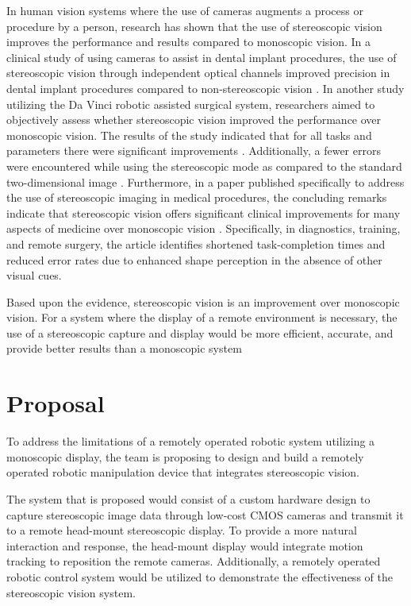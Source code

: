 \documentclass[12pt, journal]{IEEEtran}
\begin{document}
In human vision systems where the use of cameras augments a process or procedure by a person, research has shown that the use of stereoscopic vision improves the performance and results compared to monoscopic vision.  In a clinical study of using cameras to assist in dental implant procedures, the use of stereoscopic vision through independent optical channels improved precision in dental implant procedures compared to non-stereoscopic vision \cite{wanschitz}.  In another study utilizing the Da Vinci robotic assisted surgical system, researchers aimed to objectively assess whether stereoscopic vision improved the performance over monoscopic vision. The results of the study indicated that for all tasks and parameters there were significant improvements \cite{munz}. Additionally, a fewer errors were encountered while using the stereoscopic mode as compared to the standard two-dimensional image \cite{munz}.  Furthermore, in a paper published specifically to address the use of stereoscopic imaging in medical procedures, the concluding remarks indicate that stereoscopic vision offers significant clinical improvements for many aspects of medicine over monoscopic vision \cite{held}.  Specifically, in diagnostics, training, and remote surgery, the article identifies shortened task-completion times and reduced error rates due to enhanced shape perception in the absence of other visual cues.

Based upon the evidence, stereoscopic vision is an improvement over monoscopic vision.  For a system where the display of a remote environment is necessary, the use of a stereoscopic capture and display would be more efficient, accurate, and provide better results than a monoscopic system

\section{Proposal}
To address the limitations of a remotely operated robotic system utilizing a monoscopic display, the team is proposing to design and build a remotely operated robotic manipulation device that integrates stereoscopic vision.

The system that is proposed would consist of a custom hardware design to capture stereoscopic image data through low-cost CMOS cameras and transmit it to a remote head-mount stereoscopic display.  To provide a more natural interaction and response, the head-mount display would integrate motion tracking to reposition the remote cameras.  Additionally, a remotely operated robotic control system would be utilized to demonstrate the effectiveness of the stereoscopic vision system.
\end{document}
